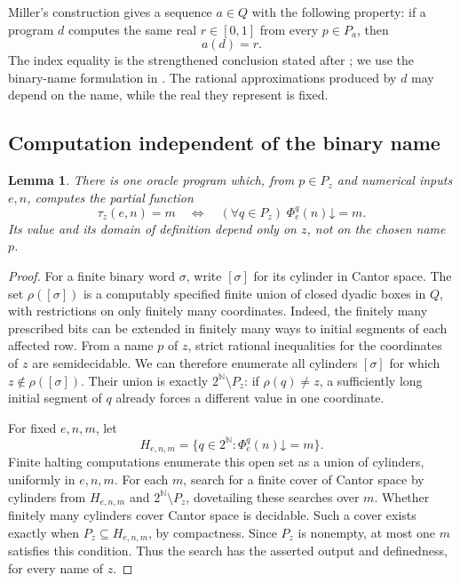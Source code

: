 \documentclass[11pt]{article}
\newtheorem{lemma}[theorem]{Lemma}
\newcommand{\N}{\mathbb N}
\begin{document}
Miller's construction gives a sequence $a\in Q$ with the following
property: if a program $d$ computes the same real $r\in[0,1]$ from
every $p\in P_a$, then
\begin{equation}\label{eq:miller-property}
 a(d)=r.
\end{equation}
The index equality is the strengthened conclusion stated after
\cite[Theorem~6.3]{Miller2004}; we use the binary-name formulation in
\cite[Section~2.1 and Theorem~2.2]{BauerHanson}.
The rational approximations produced by $d$ may depend on the name,
while the real they represent is fixed.

\subsection{Computation independent of the binary name}
\label{sec:miller-category}

\begin{lemma}\label{lem:miller-unanimity}
There is one oracle program which, from $p\in P_z$ and numerical inputs
$e,n$, computes the partial function
\[
 \tau_z(e,n)=m
 \quad\Longleftrightarrow\quad
 (\forall q\in P_z)\;\Phi_e^q(n)\mathord\downarrow=m.
\]
Its value and its domain of definition depend only on $z$, not on the
chosen name $p$.
\end{lemma}
\begin{proof}
For a finite binary word $\sigma$, write $[\sigma]$ for its cylinder in
Cantor space. The set $\rho([\sigma])$ is a computably specified finite
union of closed dyadic boxes in $Q$, with restrictions on only finitely
many coordinates. Indeed, the finitely many prescribed bits can be
extended in finitely many ways to initial segments of each affected row.
From a name $p$ of $z$, strict rational inequalities for the coordinates
of $z$ are semidecidable. We can therefore enumerate all cylinders
$[\sigma]$ for which $z\notin\rho([\sigma])$. Their union is exactly
$2^{\N}\setminus P_z$: if $\rho(q)\ne z$, a sufficiently long initial
segment of $q$ already forces a different value in one coordinate.

For fixed $e,n,m$, let
\[
 H_{e,n,m}=\{q\in2^{\N}:\Phi_e^q(n)\mathord\downarrow=m\}.
\]
Finite halting computations enumerate this open set as a union of
cylinders, uniformly in $e,n,m$. For each $m$, search for a finite cover
of Cantor space by cylinders from $H_{e,n,m}$ and
$2^{\N}\setminus P_z$, dovetailing these searches over $m$. Whether finitely
many cylinders cover Cantor space is decidable. Such a cover exists
exactly when $P_z\subseteq H_{e,n,m}$, by compactness. Since $P_z$ is
nonempty, at most one $m$ satisfies this condition. Thus the search has
the asserted output and definedness, for every name of $z$.
\end{proof}
\end{document}
